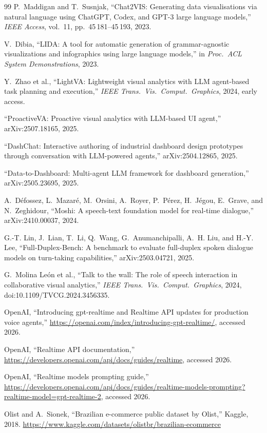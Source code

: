 \documentclass[journal]{IEEEtran}
\begin{document}
\begin{thebibliography}{99}
P.~Maddigan and T.~Susnjak, ``Chat2VIS: Generating data visualisations via natural language using ChatGPT, Codex, and GPT-3 large language models,'' \emph{IEEE Access}, vol.~11, pp.\ 45\,181--45\,193, 2023.

V.~Dibia, ``LIDA: A tool for automatic generation of grammar-agnostic visualizations and infographics using large language models,'' in \emph{Proc.\ ACL System Demonstrations}, 2023.

Y.~Zhao et al., ``LightVA: Lightweight visual analytics with LLM agent-based task planning and execution,'' \emph{IEEE Trans.\ Vis.\ Comput.\ Graphics}, 2024, early access.

``ProactiveVA: Proactive visual analytics with LLM-based UI agent,'' arXiv:2507.18165, 2025.

``DashChat: Interactive authoring of industrial dashboard design prototypes through conversation with LLM-powered agents,'' arXiv:2504.12865, 2025.

``Data-to-Dashboard: Multi-agent LLM framework for dashboard generation,'' arXiv:2505.23695, 2025.

A.~D\'efossez, L.~Mazar\'e, M.~Orsini, A.~Royer, P.~P\'erez, H.~J\'egou, E.~Grave, and N.~Zeghidour, ``Moshi: A speech-text foundation model for real-time dialogue,'' arXiv:2410.00037, 2024.

G.-T. Lin, J.~Lian, T.~Li, Q.~Wang, G.~Anumanchipalli, A.~H. Liu, and H.-Y. Lee, ``Full-Duplex-Bench: A benchmark to evaluate full-duplex spoken dialogue models on turn-taking capabilities,'' arXiv:2503.04721, 2025.

G.~Molina Le\'on et al., ``Talk to the wall: The role of speech interaction in collaborative visual analytics,'' \emph{IEEE Trans.\ Vis.\ Comput.\ Graphics}, 2024, doi:10.1109/TVCG.2024.3456335.

OpenAI, ``Introducing gpt-realtime and Realtime API updates for production voice agents,'' \url{https://openai.com/index/introducing-gpt-realtime/}, accessed 2026.

OpenAI, ``Realtime API documentation,'' \url{https://developers.openai.com/api/docs/guides/realtime}, accessed 2026.

OpenAI, ``Realtime models prompting guide,'' \url{https://developers.openai.com/api/docs/guides/realtime-models-prompting?realtime-model=gpt-realtime-2}, accessed 2026.

Olist and A.~Sionek, ``Brazilian e-commerce public dataset by Olist,'' Kaggle, 2018. \url{https://www.kaggle.com/datasets/olistbr/brazilian-ecommerce}

\end{thebibliography}
\end{document}
